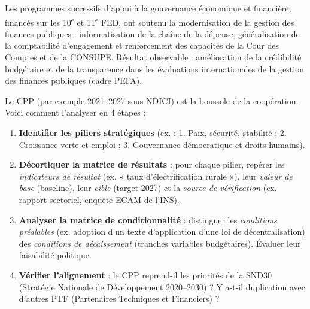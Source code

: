 \documentclass[11pt]{article}
\newcommand{\cle}[1]{{\popxbold\color{popdark}#1}}
\begin{document}
\begin{exemplebox}
Les programmes successifs d'appui à la gouvernance économique et financière, financés sur les 10\textsuperscript{e} et 11\textsuperscript{e} FED, ont soutenu la modernisation de la gestion des finances publiques : informatisation de la chaîne de la dépense, généralisation de la comptabilité d'engagement et renforcement des capacités de la Cour des Comptes et de la CONSUPE. Résultat observable : amélioration de la crédibilité budgétaire et de la transparence dans les évaluations internationales de la gestion des finances publiques (cadre PEFA).
\end{exemplebox}

\begin{methode}
Le CPP (par exemple 2021--2027 sous NDICI) est la boussole de la coopération. Voici comment l'analyser en 4 étapes :
\begin{enumerate}
    \item \textbf{Identifier les piliers stratégiques} (ex. : 1. Paix, sécurité, stabilité ; 2. Croissance verte et emploi ; 3. Gouvernance démocratique et droits humains).
    \item \textbf{Décortiquer la matrice de résultats} : pour chaque pilier, repérer les \emph{indicateurs de résultat} (ex. « taux d'électrification rurale »), leur \emph{valeur de base} (baseline), leur \emph{cible} (target 2027) et la \emph{source de vérification} (ex. rapport sectoriel, enquête ECAM de l'INS).
    \item \textbf{Analyser la matrice de conditionnalité} : distinguer les \emph{conditions préalables} (ex. adoption d'un texte d'application d'une loi de décentralisation) des \emph{conditions de décaissement} (tranches variables budgétaires). Évaluer leur faisabilité politique.
    \item \textbf{Vérifier l'alignement} : le CPP reprend-il les priorités de la \cle{SND30} (Stratégie Nationale de Développement 2020--2030) ? Y a-t-il duplication avec d'autres PTF (Partenaires Techniques et Financiers) ?
\end{enumerate}
\end{methode}
\end{document}

